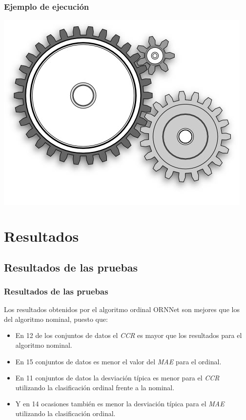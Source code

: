 \documentclass[compress,allowframebreaks]{beamer}
\begin{document}
			\begin{frame}
				\frametitle{\normalsize Ejemplo de ejecución}
				
				\begin{center}
					\includegraphics[scale=0.4]{img/ruedadentini.jpg}
				\end{center}
			\end{frame}
	
	\section{Resultados}
	
		\subsection{Resultados de las pruebas}
		
			\begin{frame}\justifying
				\frametitle{\normalsize Resultados de las pruebas}
				
				Los resultados obtenidos por el algoritmo ordinal ORNNet son mejores que los del algoritmo nominal, puesto que:
				
				\begin{itemize}\justifying
					\item En 12 de los conjuntos de datos el \textit{CCR} es mayor que los resultados para el algoritmo nominal.
					\item En 15 conjuntos de datos es menor el valor del \textit{MAE} para el ordinal.
					\item En 11 conjuntos de datos la desviación típica es menor para el \textit{CCR} utilizando la clasificación ordinal frente a la nominal.
					\item Y en 14 ocasiones también es menor la desviación típica para el \textit{MAE} utilizando la clasificación ordinal.
				\end{itemize}
			\end{frame}
	
\end{document}
